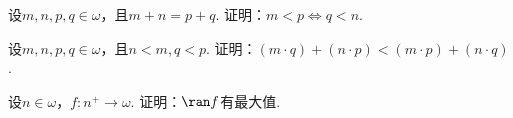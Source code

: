 \begin{example}
设\(m,n,p,q\in\omega\)，且\(m+n=p+q\).
证明：\(m<p \iff q<n\).
\end{example}

\begin{example}
设\(m,n,p,q\in\omega\)，且\(n<m,q<p\).
证明：\((m \cdot q)+(n \cdot p)<(m \cdot p)+(n \cdot q)\).
\end{example}

\begin{example}
设\(n\in\omega\)，\(f\colon n^+\to\omega\).
证明：\(\ran f\)有最大值.
\end{example}
